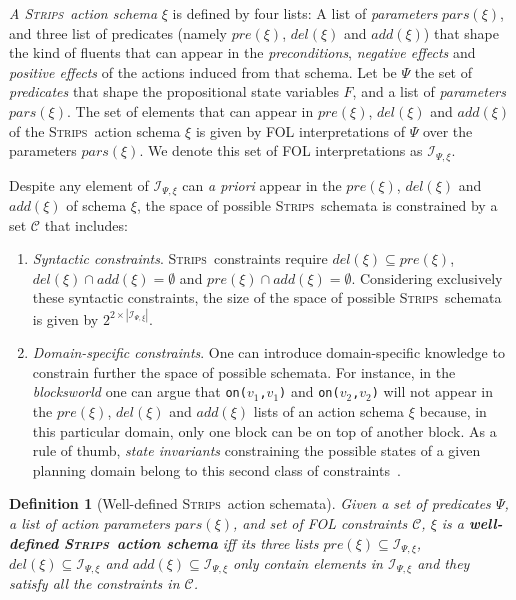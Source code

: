 \documentclass{article}
\newcommand{\strips}{\textsc{Strips}}
\newtheorem{definition}[theorem]{Definition}
\begin{document}
{\em A \strips\ action schema} $\xi$ is defined by four lists: A list of {\em parameters} $pars(\xi)$, and three list of predicates (namely $pre(\xi)$, $del(\xi)$ and $add(\xi)$) that shape the kind of fluents that can appear in the {\em preconditions}, {\em negative effects} and {\em positive effects} of the actions induced from that schema. Let be $\Psi$ the set of {\em predicates} that shape the propositional state variables $F$, and a list of {\em parameters} $pars(\xi)$. The set of elements that can appear in $pre(\xi)$, $del(\xi)$ and $add(\xi)$ of the \strips\ action schema $\xi$ is given by FOL interpretations of $\Psi$ over the parameters $pars(\xi)$. We denote this set of FOL interpretations as ${\mathcal I}_{\Psi,\xi}$. 

Despite any element of ${\mathcal I}_{\Psi,\xi}$ can {\em a priori} appear in the $pre(\xi)$, $del(\xi)$ and $add(\xi)$ of schema $\xi$, the space of possible \strips\ schemata is constrained by a set ${\mathcal C}$ that includes:

\begin{enumerate}
\item {\em Syntactic constraints}. \strips\ constraints require $del(\xi)\subseteq pre(\xi)$, $del(\xi)\cap add(\xi)=\emptyset$ and $pre(\xi)\cap add(\xi)=\emptyset$. Considering exclusively these syntactic constraints, the size of the space of possible \strips\ schemata is given by $2^{2\times|{\mathcal I}_{\Psi,\xi}|}$. 

\item {\em Domain-specific constraints}. One can introduce domain-specific knowledge to constrain further the space of possible schemata. For instance, in the {\em blocksworld} one can argue that {\small\tt on($v_1$,$v_1$)} and {\small\tt on($v_2$,$v_2$)} will not appear in the $pre(\xi)$, $del(\xi)$ and $add(\xi)$ lists of an action schema $\xi$ because, in this particular domain, only one block can be on top of another block. As a rule of thumb, {\it state invariants} constraining the possible states of a given planning domain belong to this second class of constraints~\cite{fox1998automatic}. 
\end{enumerate}

\begin{definition}[Well-defined \strips\ action schemata]
Given a set of {\em predicates} $\Psi$, a list of action {\em parameters} $pars(\xi)$, and set of FOL constraints ${\mathcal C}$, $\xi$ is a {\bf well-defined \strips\ action schema} iff its three lists $pre(\xi)\subseteq {\mathcal I}_{\Psi,\xi}$, $del(\xi)\subseteq{\mathcal I}_{\Psi,\xi}$ and $add(\xi)\subseteq{\mathcal I}_{\Psi,\xi}$ only contain elements in ${\mathcal I}_{\Psi,\xi}$ and they satisfy all the constraints in ${\mathcal C}$.
\end{definition}
\end{document}
